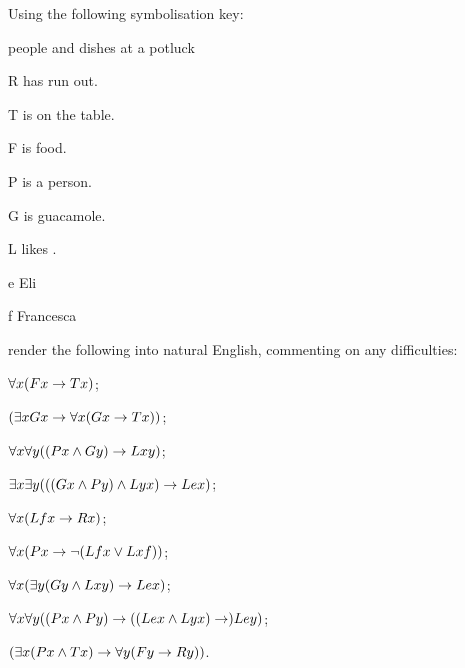 \problempart
Using the following symbolisation key:
\begin{ekey}
\item[\text{domain}] people and dishes at a potluck
\item[R]  has run out.
\item[T]  is on the table.
\item[F]  is food.
\item[P]  is a person.
\item[G]  is guacamole.
\item[L]  likes .
\item[e] Eli
\item[f] Francesca
\end{ekey}
render the following into natural English, commenting on any difficulties:
\begin{earg}
\item $\forall x (Fx \rightarrow Tx)$; %
\item $(\exists x Gx \rightarrow \forall x (Gx \rightarrow Tx))$; %
\item $\forall x \forall y ((Px \wedge Gy)\rightarrow Lxy)$; %
\item $\exists x \exists y (((Gx\wedge Py) \wedge Lyx) \rightarrow Lex)$; %
\item $\forall x(Lfx \rightarrow Rx) $; %
\item $\forall x (Px \to \neg (Lfx \vee Lxf))$; %
\item $\forall x (\exists y (Gy \wedge Lxy) \to Lex)$; %
\item $\forall x \forall y ((Px \wedge Py) \rightarrow ((Lex \wedge Lyx) \rightarrow) Ley)$; %
\item $(\exists x (Px \wedge Tx) \rightarrow \forall y (Fy \to Ry))$. %
\end{earg}


